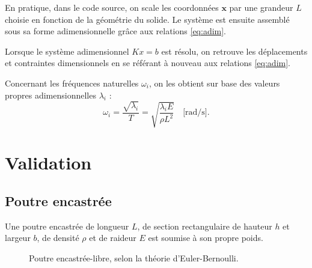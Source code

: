 \documentclass[12pt]{article}
\newcommand{\xx}{\mathbf{x}}
\begin{document}
En pratique, dans le code source, on scale les coordonnées $\xx$ par une 
grandeur $L$ choisie en fonction de la géométrie du solide. Le système est
ensuite assemblé sous sa forme adimensionnelle grâce aux relations 
\eqref{eq:adim}.

Lorsque le système adimensionnel $Kx=b$ est résolu, on retrouve les 
déplacements et contraintes dimensionnels en se référant à nouveau aux
relations \eqref{eq:adim}.

Concernant les fréquences naturelles $\omega_i$, on les obtient sur base 
des valeurs propres adimensionnelles $\lambda_i$ :
\begin{equation}
    \omega_i = \frac{\sqrt{\lambda_i}}{T} = \sqrt{\frac{\lambda_i E}{\rho L^2}} \quad\text{[rad/s]}.
\end{equation}


\newpage
\section{Validation}

\subsection{Poutre encastrée}
Une poutre encastrée de longueur $L$, de section rectangulaire de hauteur $h$
et largeur $b$, de densité $\rho$ et de raideur $E$ est soumise à son propre 
poids.

\begin{figure}[h]
    \centering
    \caption{Poutre encastrée-libre, selon la théorie d'Euler-Bernoulli.}
    \label{fig:beam}
\end{figure}
\end{document}
